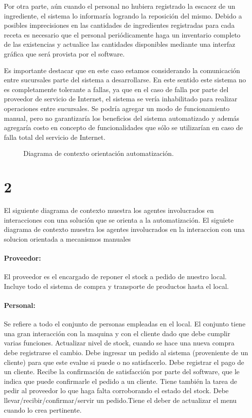 \documentclass[a4paper,10pt]{article}
\begin{document}
Por otra parte, aún cuando el personal no hubiera registrado la escacez de un ingrediente, el sistema lo informaría logrando la reposición del mismo. Debido a posibles imprecisiones en las cantidades de ingredientes registradas para cada receta es necesario que el personal periódicamente haga un inventario completo de las existencias y actualice las cantidades disponibles mediante una interfaz gráfica que será provista por el software.

Es importante destacar que en este caso estamos considerando la comunicación entre sucursales parte del sistema a desarrollarse. En este sentido este sistema no es completamente tolerante a fallas, ya que en el caso de falla por parte del proveedor de servicio de Internet, el sistema se vería inhabilitado para realizar operaciones entre sucursales. Se podría agregar un modo de funcionamiento manual, pero no garantizaría los beneficios del sistema automatizado y además agregaría costo en concepto de funcionalidades que sólo se utilizarían en caso de falla total del servicio de Internet. 
\begin{figure}[H]
\centering
{}
\caption{Diagrama de contexto orientación automatización.}
\end{figure}

\section*{2}
El siguiente diagrama de contexto muestra los agentes involucrados en interacciones con una solución que se orienta a la automatización. 
El siguiete diagrama de contexto muestra los agentes involucrados en la interaccion con una solucion orientada a mecanismos manuales


\paragraph{Proveedor:}
El proveedor es el encargado de reponer el stock a pedido de nuestro local. Incluye todo el sistema de compra y transporte de productos hasta el local.
\\
\paragraph{Personal:}
Se refiere a todo el conjunto de personas empleadas en el local. El conjunto tiene una gran interacción con la maquina y con el cliente dado que debe cumplir varias funciones. Actualizar nivel de stock, cuando se hace una nueva compra debe registrarse el cambio. Debe ingresar un pedido al sistema (proveniente de un cliente) para que este evalue si puede o no satisfacerlo. Debe registrar el pago de un cliente. Recibe la confirmación de satisfacción por parte del software, que le indica que puede confirmarle el pedido a un cliente. Tiene también la tarea de pedir al proveedor lo que haga falta corroborando el estado del stock. Debe llevar/recibir/confirmar/servir un pedido.Tiene el deber de actualizar el menu cuando lo crea pertinente.
\\
\end{document}

